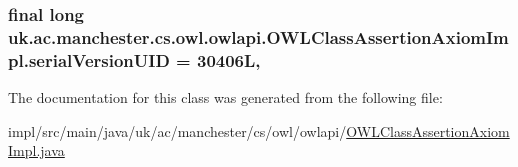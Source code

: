 \hypertarget{classuk_1_1ac_1_1manchester_1_1cs_1_1owl_1_1owlapi_1_1_o_w_l_class_assertion_axiom_impl_aec277428d067df4d5e2a2c9a87902c8c}{
\subsubsection[{serial\-Version\-U\-I\-D}]{\setlength{\rightskip}{0pt plus 5cm}final long uk.\-ac.\-manchester.\-cs.\-owl.\-owlapi.\-O\-W\-L\-Class\-Assertion\-Axiom\-Impl.\-serial\-Version\-U\-I\-D = 30406\-L\hspace{0.3cm}{\ttfamily [static]}, {\ttfamily [private]}}}\label{classuk_1_1ac_1_1manchester_1_1cs_1_1owl_1_1owlapi_1_1_o_w_l_class_assertion_axiom_impl_aec277428d067df4d5e2a2c9a87902c8c}


The documentation for this class was generated from the following file\-:\begin{DoxyCompactItemize}
\item 
impl/src/main/java/uk/ac/manchester/cs/owl/owlapi/\hyperlink{_o_w_l_class_assertion_axiom_impl_8java}{O\-W\-L\-Class\-Assertion\-Axiom\-Impl.\-java}\end{DoxyCompactItemize}
